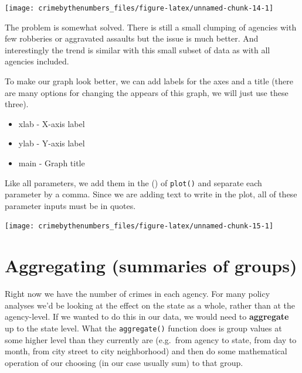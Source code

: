 \documentclass[
  12pt,
]{book}
\newenvironment{Shaded}{\begin{snugshade}}{\end{snugshade}}
\newcommand{\DataTypeTok}[1]{\textcolor[rgb]{0.27,0.27,0.27}{#1}}
\newcommand{\KeywordTok}[1]{\textcolor[rgb]{0.27,0.27,0.27}{\textbf{#1}}}
\newcommand{\NormalTok}[1]{#1}
\newcommand{\OperatorTok}[1]{\textcolor[rgb]{0.43,0.43,0.43}{\textbf{#1}}}
\newcommand{\StringTok}[1]{\textcolor[rgb]{0.5,0.5,0.5}{#1}}
\providecommand{\tightlist}{%
  \setlength{\itemsep}{0pt}\setlength{\parskip}{0pt}}
\begin{document}
\begin{center}\texttt{[image: crimebythenumbers\_files/figure-latex/unnamed-chunk-14-1]} \end{center}

The problem is somewhat solved. There is still a small clumping of agencies with few robberies or aggravated assaults but the issue is much better. And interestingly the trend is similar with this small subset of data as with all agencies included.

To make our graph look better, we can add labels for the axes and a title (there are many options for changing the appears of this graph, we will just use these three).

\begin{itemize}
\tightlist
\item
  xlab - X-axis label
\item
  ylab - Y-axis label
\item
  main - Graph title
\end{itemize}

Like all parameters, we add them in the () of \texttt{plot()} and separate each parameter by a comma. Since we are adding text to write in the plot, all of these parameter inputs must be in quotes.

\begin{Shaded}
\end{Shaded}

\begin{center}\texttt{[image: crimebythenumbers\_files/figure-latex/unnamed-chunk-15-1]} \end{center}

\hypertarget{aggregate}{%
\section{Aggregating (summaries of groups)}\label{aggregate}}

Right now we have the number of crimes in each agency. For many policy analyses we'd be looking at the effect on the state as a whole, rather than at the agency-level. If we wanted to do this in our data, we would need to \textbf{aggregate} up to the state level. What the \texttt{aggregate()} function does is group values at some higher level than they currently are (e.g.~from agency to state, from day to month, from city street to city neighborhood) and then do some mathematical operation of our choosing (in our case usually sum) to that group.
\end{document}
